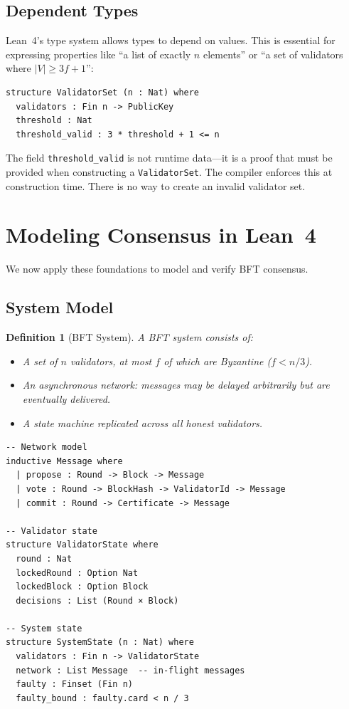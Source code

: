 \documentclass[11pt,a4paper]{article}
\newtheorem{definition}{Definition}
\begin{document}
\subsection{Dependent Types}

Lean~4's type system allows types to depend on values. This is essential for expressing
properties like ``a list of exactly $n$ elements'' or ``a set of validators where
$|V| \geq 3f + 1$'':

\begin{lstlisting}[language=Lean,caption={Dependent types for validator sets}]
structure ValidatorSet (n : Nat) where
  validators : Fin n -> PublicKey
  threshold : Nat
  threshold_valid : 3 * threshold + 1 <= n
\end{lstlisting}

The field \texttt{threshold\_valid} is not runtime data---it is a proof that must be
provided when constructing a \texttt{ValidatorSet}. The compiler enforces this at
construction time. There is no way to create an invalid validator set.

\section{Modeling Consensus in Lean~4}

We now apply these foundations to model and verify BFT consensus.

\subsection{System Model}

\begin{definition}[BFT System]
A BFT system consists of:
\begin{itemize}[nosep]
  \item A set of $n$ validators, at most $f$ of which are Byzantine ($f < n/3$).
  \item An asynchronous network: messages may be delayed arbitrarily but are eventually delivered.
  \item A state machine replicated across all honest validators.
\end{itemize}
\end{definition}

\begin{lstlisting}[language=Lean,caption={BFT system model in Lean~4}]
-- Network model
inductive Message where
  | propose : Round -> Block -> Message
  | vote : Round -> BlockHash -> ValidatorId -> Message
  | commit : Round -> Certificate -> Message

-- Validator state
structure ValidatorState where
  round : Nat
  lockedRound : Option Nat
  lockedBlock : Option Block
  decisions : List (Round × Block)

-- System state
structure SystemState (n : Nat) where
  validators : Fin n -> ValidatorState
  network : List Message  -- in-flight messages
  faulty : Finset (Fin n)
  faulty_bound : faulty.card < n / 3
\end{lstlisting}
\end{document}
